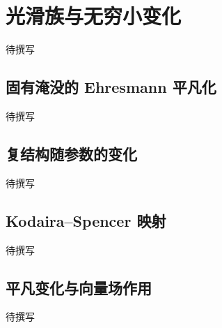 
% 
% 

\section{光滑族与无穷小变化}
\label{g4:sec:2901}

待撰写

\subsection{固有淹没的 Ehresmann 平凡化}
\label{g4:subsec:2901:01}
待撰写

\subsection{复结构随参数的变化}
\label{g4:subsec:2901:02}
待撰写

\subsection{Kodaira–Spencer 映射}
\label{g4:subsec:2901:03}
待撰写

\subsection{平凡变化与向量场作用}
\label{g4:subsec:2901:04}
待撰写
